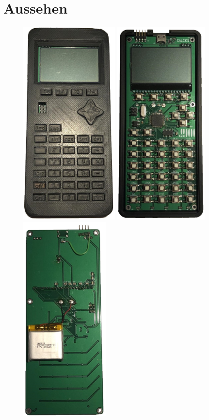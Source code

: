 \documentclass[12pt, a4paper]{report}
\begin{document}
\section{Aussehen}
\begin{figure}[H]
\includegraphics[height=10.5cm]{assets/calcincase.JPG}
\includegraphics[height=10.5cm]{assets/calctoppcb.JPG}
\includegraphics[height=10.6cm]{assets/calcbottompcb.JPG}

\end{figure}
\end{document}
